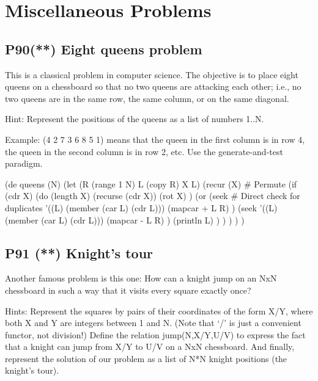 \pagebreak{}
\section*{Miscellaneous Problems}

\subsection*{{P90}(**) Eight queens problem}
\label{sec:99-problems-P90} 

This is a classical problem in computer science. The objective is to
place eight queens on a chessboard so that no two queens are attacking
each other; i.e., no two queens are in the same row, the same column, or
on the same diagonal.

 Hint: Represent the positions of the queens as
a list of numbers 1..N.

 Example: (4 2 7 3 6 8 5 1) means that the
queen in the first column is in row 4, the queen in the second column is
in row 2, etc. Use the generate-and-test paradigm.

\begin{wideverbatim}

(de queens (N)
   (let (R (range 1 N)  L (copy R)  X L)
      (recur (X)  # Permute
         (if (cdr X)
            (do (length X)
               (recurse (cdr X))
               (rot X) )
            (or
               (seek  # Direct check for duplicates
                  '((L) (member (car L) (cdr L)))
                  (mapcar + L R) )
               (seek
                  '((L) (member (car L) (cdr L)))
                  (mapcar - L R) )
               (println L) ) ) ) ) )

\end{wideverbatim}

\pagebreak{}
\subsection*{{P91} (**) Knight's tour}
\label{sec:99-problems-P91}

Another famous problem is this one: How can a knight jump on an NxN
chessboard in such a way that it visits every square exactly once?

Hints: Represent the squares by pairs of their coordinates of the form
X/Y, where both X and Y are integers between 1 and N. (Note that `/' is
just a convenient functor, not division!) Define the relation
jump(N,X/Y,U/V) to express the fact that a knight can jump from X/Y to
U/V on a NxN chessboard. And finally, represent the solution of our
problem as a list of N*N knight positions (the knight's tour).

